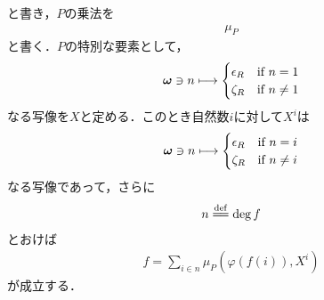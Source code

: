 	と書き，$P$の乗法を
	\begin{align}
		\mu_P
	\end{align}
	と書く．$P$の特別な要素として，
	\begin{align}
		{\boldsymbol \omega} \ni n \longmapsto
		\begin{cases}
			\epsilon_R & \mbox{if } n = 1 \\
			\zeta_R & \mbox{if } n \neq 1
		\end{cases}
	\end{align}
	なる写像を$X$と定める．このとき自然数$i$に対して$X^i$は
	\begin{align}
		{\boldsymbol \omega} \ni n \longmapsto
		\begin{cases}
			\epsilon_R & \mbox{if } n = i \\
			\zeta_R & \mbox{if } n \neq i
		\end{cases}
	\end{align}
	なる写像であって，さらに
	\begin{align}
		n \defeq \deg{f}
	\end{align}
	とおけば
	\begin{align}
		f = \sum_{i \in n} \mu_P \left(\varphi(f(i)),X^i\right)
	\end{align}
	が成立する．
	
